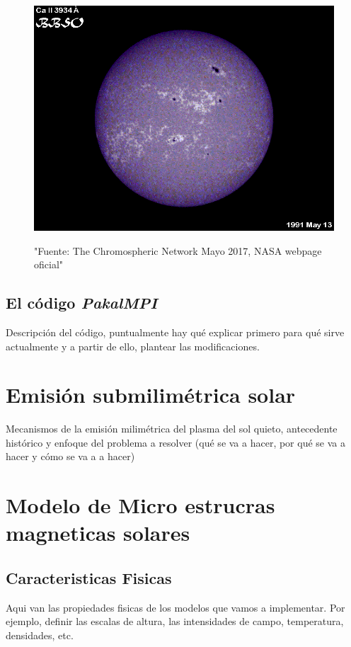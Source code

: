 \documentclass[9pt]{book}
\begin{document}

\begin{figure}[h]
\caption{"Fuente: The Chromospheric Network Mayo 2017, NASA webpage oficial"}
\centering
\includegraphics[scale=0.3]{CAII3934}
\label{fig:chromosphericnet}
\end{figure}



\section{El c\'odigo \emph{PakalMPI}}
Descripci\'on del c\'odigo, puntualmente hay qu\'e explicar primero para qu\'e sirve actualmente y a partir de ello, plantear las modificaciones.


\chapter{Emisi\'on submilim\'etrica solar}
Mecanismos de la emisi\'on milim\'etrica del plasma del sol quieto, antecedente hist\'orico y enfoque del problema a resolver (qu\'e se va a hacer, por qu\'e se va a hacer y c\'omo se va a a hacer)
  
\chapter{Modelo de Micro estrucras magneticas solares}
\section{Caracteristicas Fisicas}
Aqui van las propiedades fisicas de los modelos que vamos a implementar. Por ejemplo, definir las escalas de altura, las intensidades de campo, temperatura, densidades, etc.
\end{document}
